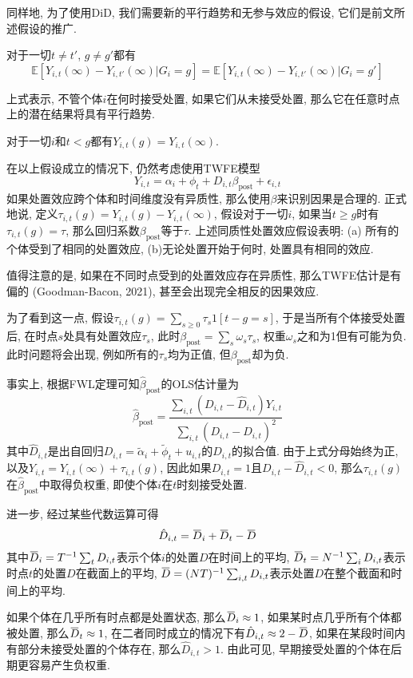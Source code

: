 \documentclass[cn,sakura,14pt,screen,bibstyle=gb7714-2015,math=mtpro2]{elegantnote}
\newcommand{\E}{\mathbb{E}}
\newcommand{\overbar}[1]{\mkern 1.5mu\overline{\mkern-1.5mu#1\mkern-1.5mu}\mkern 1.5mu}
\begin{document}
同样地, 为了使用DiD, 我们需要新的平行趋势和无参与效应的假设, 它们是前文所述假设的推广.
\begin{definition}[平行趋势]
对于一切$t\neq t'$, $g\neq g'$都有
$$\E[Y_{i,t}(\infty)-Y_{i,t'}(\infty)|G_i=g]=\E[Y_{i,t}(\infty)-Y_{i,t'}(\infty)|G_i=g']$$
\end{definition}
上式表示, 不管个体$i$在何时接受处置, 如果它们从未接受处置, 那么它在任意时点上的潜在结果将具有平行趋势.

\begin{definition}[无参与效应]
对于一切$i$和$t<g$都有$Y_{i,t}(g)=Y_{i,t}(\infty)$.
\end{definition}

在以上假设成立的情况下, 仍然考虑使用TWFE模型
$$Y_{i,t}=\alpha_i+\phi_t+D_{i,t}\beta_\text{post}+\epsilon_{i,t}$$
如果处置效应跨个体和时间维度没有异质性, 那么使用$\beta$来识别因果是合理的. 正式地说, 定义$\tau_{i,t}(g)=Y_{i,t}(g)-Y_{i,t}(\infty)$, 假设对于一切$i$, 如果当$t\ge g$时有$\tau_{i,t}(g)=\tau$, 那么回归系数$\beta_{\text{post}}$等于$\tau$. 上述同质性处置效应假设表明: (a) 所有的个体受到了相同的处置效应, (b)无论处置开始于何时, 处置具有相同的效应.

值得注意的是, 如果在不同时点受到的处置效应存在异质性, 那么TWFE估计是有偏的 (Goodman-Bacon, 2021), 甚至会出现完全相反的因果效应.

为了看到这一点, 假设$\tau_{i,t}(g)=\sum_{s\ge0}\tau_s1[t-g=s]$, 于是当所有个体接受处置后, 在时点$s$处具有处置效应$\tau_s$, 此时$\beta_\text{post}=\sum_s\omega_s\tau_s$, 权重$\omega_s$之和为1但有可能为负. 此时问题将会出现, 例如所有的$\tau_s$均为正值, 但$\beta_\text{post}$却为负.

事实上, 根据FWL定理可知$\hat{\beta}_{\text{post}}$的OLS估计量为
$$\hat{\beta}_\text{post}=\frac{\sum_{i,t}(D_{i,t}-\hat{D}_{i,t})Y_{i,t}}{\sum_{i,t}(D_{i,t}-\hat{D}_{i,t})^2}$$
其中$\hat{D}_{i,t}$是出自回归$D_{i,t}=\tilde{\alpha}_i+\tilde{\phi}_t+u_{i,t}$的$D_{i,t}$的拟合值. 由于上式分母始终为正, 以及$Y_{i,t}=Y_{i,t}(\infty)+\tau_{i,t}(g)$, 因此如果$D_{i,t}=1$且$D_{i,t}-\hat{D}_{i,t}<0$, 那么$\tau_{i,t}(g)$在$\hat{\beta}_\text{post}$中取得负权重, 即使个体$i$在$t$时刻接受处置.

进一步, 经过某些代数运算可得
$$\hat{D}_{i,t}=\overbar{D}_i+\overbar{D}_t-\overbar{D}$$
其中$\overbar{D}_i=T^{-1}\sum_t D_{i,t}$表示个体$i$的处置$D$在时间上的平均, $\overbar{D}_t=N^{-1}\sum_i D_{i,t}$表示时点$t$的处置$D$在截面上的平均, $\overbar{D}=(NT)^{-1}\sum_{i,t}D_{i,t}$表示处置$D$在整个截面和时间上的平均.

如果个体在几乎所有时点都是处置状态, 那么$\overbar{D}_i\approx 1$, 如果某时点几乎所有个体都被处置, 那么$\overbar{D}_t\approx 1$, 在二者同时成立的情况下有$\hat{D}_{i,t}\approx 2-\overbar{D}$, 如果在某段时间内有部分未接受处置的个体存在, 那么$\hat{D}_{i,t}>1$. 由此可见, 早期接受处置的个体在后期更容易产生负权重.
\end{document}
